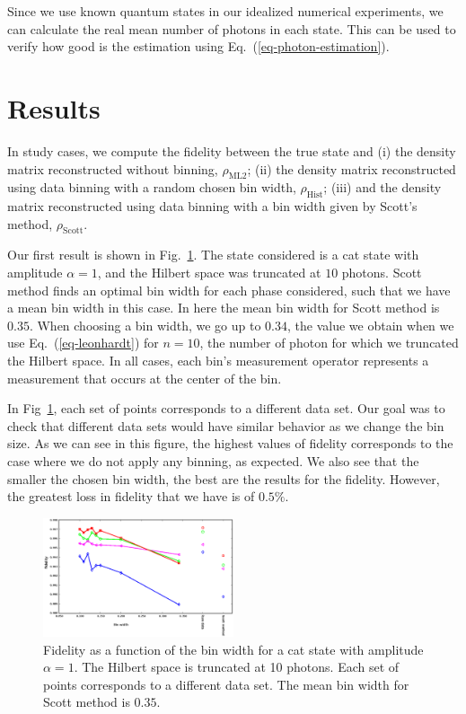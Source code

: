\documentclass[
reprint,
superscriptaddress,
showpacs,
amsmath,
amssymb,
aps,
pra,
longbibliography
]{revtex4-1}
\begin{document}
Since we use known quantum states in our idealized numerical experiments, we can
calculate the real mean number of photons in each state. This can be used to verify how good is the estimation using Eq.~(\ref{eq-photon-estimation}). 

\section{Results}
In study cases, we compute the fidelity between the true state and (i) the density matrix reconstructed without binning, $\rho_{\mathrm{ML2}}$; (ii) the density matrix reconstructed using data binning with a random chosen bin width, $\rho_{\mathrm{Hist}}$; (iii) and the density matrix reconstructed using data binning with a bin width given by Scott's method, $\rho_{\mathrm{Scott}}$.

Our first result is shown in Fig.~\ref{fig-methods_fidelity_singledata}. The state considered is a cat state with amplitude $\alpha = 1$, and the Hilbert space was truncated at $10$ photons. Scott method finds an optimal bin width for each phase considered, such that we have a mean bin width in this case. In here the mean bin width for Scott method is $0.35$. When choosing a bin width, we go up to $0.34$, the value we obtain when we use Eq.~(\ref{eq-leonhardt}) for $n=10$, the number of photon for which we truncated the Hilbert space. In all cases, each bin's measurement operator represents a measurement that occurs at the center of the bin. 
 
In Fig~\ref{fig-methods_fidelity_singledata}, each set of points corresponds to a different data set. Our goal was to check that different data sets would have similar behavior as we change the bin size. As we can see in this figure, the highest values of fidelity corresponds to the case where we do not apply any binning, as expected. We also see that the smaller the chosen bin width, the best are the results for the fidelity. However, the greatest loss in fidelity that we have is of $0.5\%$.

\begin{figure}[h]
\includegraphics[width=0.5\textwidth]{methods_fidelity_singledata.eps}
\caption{Fidelity as a function of the bin width for a cat state with amplitude $\alpha=1$. The Hilbert space is truncated at 10 photons. Each set of points corresponds to a different data set. The mean bin width for Scott
method is $0.35$.}
\label{fig-methods_fidelity_singledata}
\end{figure}
\end{document}
